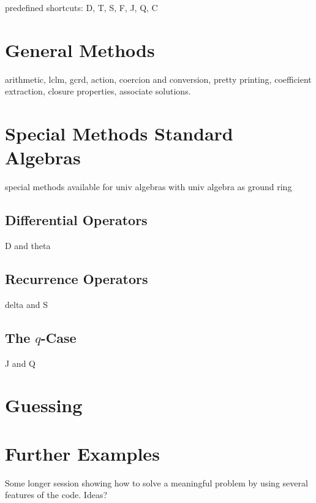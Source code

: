 \documentclass{amsart}
\begin{document}
predefined shortcuts: D, T, S, F, J, Q, C

\section{General Methods}

arithmetic, lclm, gcrd, action, coercion and conversion, pretty printing, coefficient extraction,
closure properties, associate solutions. 

\section{Special Methods Standard Algebras}

special methods available for univ algebras with univ algebra as ground ring

\subsection{Differential Operators}

D and theta

\subsection{Recurrence Operators}

delta and S

\subsection{The $q$-Case}

J and Q

\section{Guessing}

\section{Further Examples}

Some longer session showing how to solve a meaningful problem by using several features of the code. Ideas?

\subsection{}

\subsection{}

 
 
 
\end{document}
